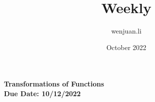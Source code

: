 \documentclass[Letterpaper, 12pt]{article}
\title{Weekly}
\author{wenjuan.li }
\date{October 2022}
\begin{document}
\pagestyle{fancy}
\fancyhead{} %

\begin{center} {\large\textbf{Transformations of Functions}}\\
	\smallskip
	\textbf{Due Date: 10/12/2022}
\end{center}
\end{document}
